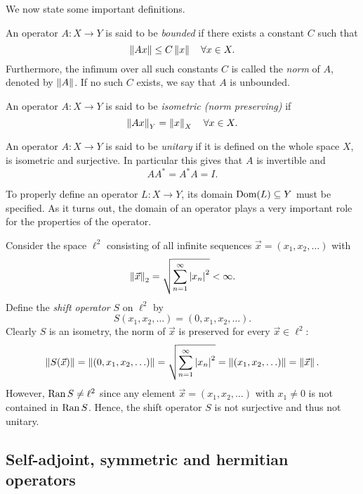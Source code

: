 We now state some important definitions.

\begin{definition}
  An operator $A: X \to Y$ is said to be \emph{bounded} if there exists a constant $C$ such that
  \[
    \left\lVert Ax\right\rVert \le C \left\lVert x\right\rVert \quad \forall x\in X.
  \]
  Furthermore, the infimum over all such constants $C$ is called the \emph{norm} of $A$, denoted by $\left\lVert A\right\rVert$. If no such $C$ exists, we say that $A$ is unbounded.
\end{definition}

\begin{definition}
  An operator $A: X \to Y$ is said to be \emph{isometric (norm preserving)} if
  \[ \left\lVert Ax\right\rVert_Y = \left\lVert x\right\rVert_X \quad \forall x \in X. \]
\end{definition}

\begin{definition}
  An operator $A: X \to Y$ is said to be \emph{unitary} if it is defined on the whole space $X$, is isometric and surjective. In particular this gives that $A$ is invertible and
  \[ AA^* = A^*A = I. \]
\end{definition}

To properly define an operator $L: X \to Y$, its domain $\operatorname{Dom}(L) \subseteq Y$ must be specified. As it turns out, the domain of an operator plays a very important role for the properties of the operator.

\begin{example}
  Consider the space $\ell^2$ consisting of all infinite sequences $\vec{x}=(x_1, x_2, \ldots)$ with
  \[
    \left\lVert\vec{x}\right\rVert_2 = \sqrt{\sum_{n=1}^{\infty} \left\lvert x_n\right\rvert^2} < \infty.
  \]
  Define the \emph{shift operator} $S$ on $\ell^2$ by
  \[
    S(x_1, x_2, \ldots) = (0, x_1, x_2, \ldots).
  \]
  Clearly $S$ is an isometry, the norm of $\vec{x}$ is preserved for every $\vec{x} \in \ell^2$:
  \[
    \left\lVert S(\vec{x})\right\rVert
    = \left\lVert(0,x_1,x_2,\ldots)\right\rVert
    = \sqrt{\sum_{n=1}^{\infty} \left\lvert x_n\right\rvert^2 }
    = \left\lVert(x_1, x_2, \ldots)\right\rVert
    = \left\lVert\vec{x}\right\rVert.
  \]
  However, $\operatorname{Ran} S \ne \ell^2$ since any element $\vec{x} = (x_1, x_2, \ldots)$ with $x_1 \ne 0$ is not contained in $\operatorname{Ran} S$. Hence, the shift operator $S$ is not surjective and thus not unitary.
\end{example}




\subsection{Self-adjoint, symmetric and hermitian operators}\label{sec: self-adjoint operators}

